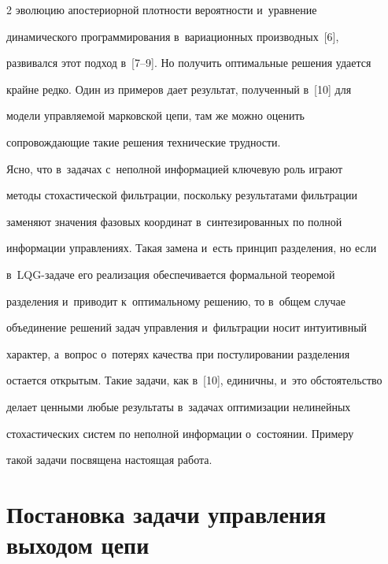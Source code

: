 \begin{multicols}{2}
эволюцию апостериорной плот\-ности вероятности и~уравнение 


динамического программирования в~вариационных производных~[6], 


развивался этот подход в~[7--9]. Но получить оптимальные решения удается 


крайне редко. Один из примеров дает результат, полученный в~[10] для 


модели управляемой марковской цепи, там же можно оценить 


сопровождающие такие решения технические трудности.


     


     Ясно, что в~задачах с~неполной информацией ключевую роль играют 


методы стохастической фильтрации, поскольку результатами фильтрации 


заменяют значения фазовых координат в~синтезированных по полной 


информации управлениях. Такая замена и~есть принцип разделения, но если 


в~LQG-за\-да\-че его реализация обеспечивается формальной теоремой 


разделения и~приводит к~оптимальному решению, то в~общем случае 


объединение решений задач управления и~фильтрации носит интуитивный 


характер, а~вопрос о~потерях качества при постулировании разделения 


остается открытым. Такие задачи, как в~[10], единичны, и~это обстоятельство 


делает ценными любые результаты в~задачах оптимизации нелинейных 


стохастических систем по неполной информации о~со\-сто\-янии. Примеру 


такой задачи посвящена настоящая ра\-бота.





\vspace*{-8pt}


     


\section{Постановка задачи управления выходом цепи}






\end{multicols}
